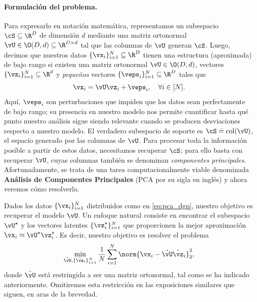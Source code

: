 \documentclass[../../book-main.tex]{subfiles}
\begin{document}
\paragraph{Formulación del problema.}
Para expresarlo en notación matemática, representamos un subespacio \(\cS
\subseteq \R^{D}\) de dimensión \(d\) mediante una matriz ortonormal \(\vU
\in \O(D, d) \subseteq \R^{D \times d}\) tal que las columnas de
\(\vU\) generan \(\cS\). Luego, decimos que nuestros datos \(\{\vx_{i}\}_{i =
1}^{N} \subseteq \R^{D}\) tienen una estructura (aproximada) de bajo rango si
existen una matriz ortonormal \(\vU \in \O(D, d)\), vectores
\(\{\vz_{i}\}_{i = 1}^{N} \subseteq \R^{d}\) y \textit{pequeños}
vectores \(\{\veps_{i}\}_{i = 1}^{N} \subseteq \R^{D}\) tales que
\begin{equation}\label{eq:pca_dgp}
    \vx_{i} = \vU\vz_{i} + \veps_{i}, \quad \forall i \in [N].
\end{equation}
Aquí, \(\veps_{i}\) son perturbaciones que impiden que los datos sean perfectamente
de bajo rango; su presencia en nuestro modelo nos permite cuantificar hasta qué punto
nuestro análisis sigue siendo relevante cuando se producen desviaciones respecto a 
nuestro modelo. El verdadero subespacio de soporte es \(\cS \doteq
\mathop{\mathrm{col}}(\vU)\), el espacio generado por las columnas de $\vU$. Para 
procesar toda la información posible a partir de estos datos, necesitamos recuperar 
\(\cS\); para ello basta con recuperar \(\vU\), cuyas columnas también se denominan 
\textit{componentes principales}. Afortunadamente, se trata de una tarea 
computacionalmente viable denominada {\bf Análisis de Componentes Principales} 
(PCA por su sigla en inglés) y ahora veremos cómo resolverla.

Dados los datos \(\{\vx_{i}\}_{i = 1}^{N}\) distribuidos como en \eqref{eq:pca_dgp}, nuestro
objetivo es recuperar el modelo \(\vU\). Un enfoque natural consiste en encontrar el subespacio
\(\vU^{\star}\) y los vectores latentes \(\{\vz_{i}^{\star}\}_{i = 1}^{N}\) que
proporcionen la mejor aproximación \(\vx_{i} \approx \vU^{\star}\vz_{i}^{\star}\). 
Es decir, nuestro objetivo es resolver el problema
\begin{equation}\label{eq:pca_sparse_recovery_problem}
    \min_{\tilde{\vU}, \{\tilde{\vz}_{i}\}_{i =
    1}^{N}}\frac{1}{N}\sum_{i = 1}^{N}\norm{\vx_{i} -
    \tilde{\vU}\tilde{\vz}_{i}}_{2}^{2},
\end{equation}
donde $\tilde{\vU}$ está restringida a ser una matriz ortonormal, tal como
se ha indicado anteriormente. Omitiremos
esta restricción en las exposiciones similares que siguen, en aras de la brevedad.
\end{document}
